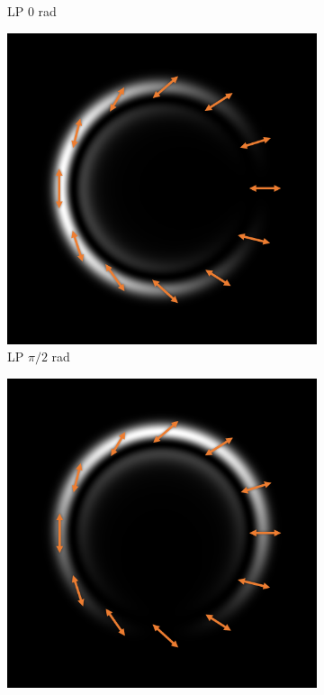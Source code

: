 \documentclass[11pt, a4paper, twoside]{article} %
\begin{document}
\begin{figure}[h!]
\begin{subfigure}[b]{0.245\linewidth}
    \caption{LP 0 rad}
     \end{subfigure}
 \begin{subfigure}[b]{0.245\linewidth}
     \includegraphics[width=\linewidth]{simul22.PNG}
     \caption{LP $\pi/2$ rad}
     \end{subfigure}
  \begin{subfigure}[b]{0.245\linewidth}
     \includegraphics[width=\linewidth]{simul24.PNG}

\end{subfigure}
\end{figure}
\end{document}
